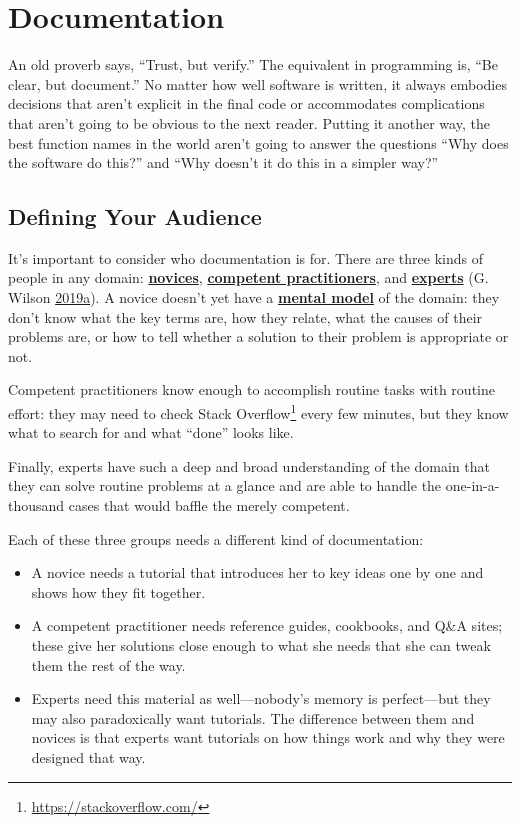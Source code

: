 \documentclass[
]{krantz}
\renewcommand{\href}[2]{#2\footnote{\url{#1}}}
\newcommand{\gref}[2]{\hyperlink{#2}{\textbf{#1}}}
\begin{document}
\hypertarget{documentation}{%
\chapter{Documentation}\label{documentation}}

An old proverb says, ``Trust, but verify.''
The equivalent in programming is, ``Be clear, but document.''
No matter how well software is written,
it always embodies decisions that aren't explicit in the final code
or accommodates complications that aren't going to be obvious to the next reader.
Putting it another way,
the best function names in the world aren't going to answer the questions
``Why does the software do this?''
and
``Why doesn't it do this in a simpler way?''

\hypertarget{documentation-audience}{%
\section{Defining Your Audience}\label{documentation-audience}}

It's important to consider who documentation is for.
There are three kinds of people in any domain:
\gref{novices}{novice},
\gref{competent practitioners}{competent\_practitioner},
and \gref{experts}{expert} (G. Wilson \protect\hyperlink{ref-Wils2018}{2019}\protect\hyperlink{ref-Wils2018}{a}).
A novice doesn't yet have a \gref{mental model}{mental\_model} of the domain:
they don't know what the key terms are,
how they relate,
what the causes of their problems are,
or how to tell whether a solution to their problem is appropriate or not.

Competent practitioners know enough to accomplish routine tasks with routine effort:
they may need to check \href{https://stackoverflow.com/}{Stack Overflow} every few minutes,
but they know what to search for and what ``done'' looks like.

Finally,
experts have such a deep and broad understanding of the domain
that they can solve routine problems at a glance
and are able to handle the one-in-a-thousand cases
that would baffle the merely competent.

Each of these three groups needs a different kind of documentation:

\begin{itemize}
\item
  A novice needs a tutorial that introduces her to key ideas one by one
  and shows how they fit together.
\item
  A competent practitioner needs reference guides, cookbooks, and Q\&A sites;
  these give her solutions close enough to what she needs
  that she can tweak them the rest of the way.
\item
  Experts need this material as well---nobody's memory is perfect---but
  they may also paradoxically want tutorials.
  The difference between them and novices is that experts want tutorials on how things work
  and why they were designed that way.
\end{itemize}
\end{document}
